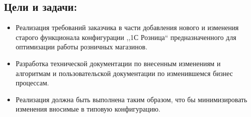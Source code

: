 \subsection{Цели и задачи:}
\begin{itemize}	
	\item Реализация требований заказчика  в части добавления нового и изменения старого функционала конфигурации ,,1С Розница`` предназначенного для оптимизации работы розничных магазинов.
	\item Разработка технической документации по внесенным изменениям и алгоритмам и пользовательской документации по изменившемся бизнес процессам.
	\item Реализация должна быть выполнена таким образом, что бы минимизировать изменения вносимые в типовую конфигурацию.
\end{itemize}	



